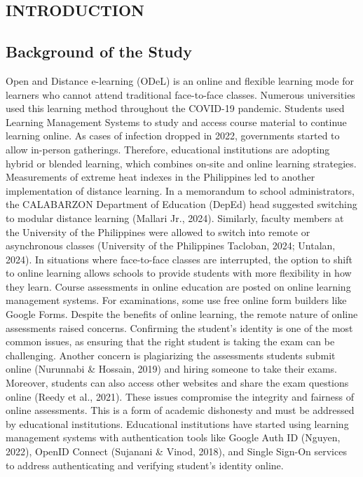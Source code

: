 \documentclass{icsthesis}
\begin{document}
\begin{mainmatter}
		\section{INTRODUCTION}
			\subsection{Background of the Study}
Open and Distance e-learning (ODeL) is an online and flexible learning mode for learners who cannot attend traditional face-to-face classes. Numerous universities used this learning method throughout the COVID-19 pandemic. Students used Learning Management Systems to study and access course material to continue learning online. As cases of infection dropped in 2022, governments started to allow in-person gatherings. Therefore, educational institutions are adopting hybrid or blended learning, which combines on-site and online learning strategies. Measurements of extreme heat indexes in the Philippines led to another implementation of distance learning. In a memorandum to school administrators, the CALABARZON Department of Education (DepEd) head suggested switching to modular distance learning (Mallari Jr., 2024). Similarly, faculty members at the University of the Philippines were allowed to switch into remote or asynchronous classes (University of the Philippines Tacloban, 2024; Untalan, 2024). In situations where face-to-face classes are interrupted, the option to shift to online learning allows schools to provide students with more flexibility in how they learn. Course assessments in online education are posted on online learning management systems. For examinations, some use free online form builders like Google Forms. Despite the benefits of online learning, the remote nature of online assessments raised concerns. Confirming the student's identity is one of the most common issues, as ensuring that the right student is taking the exam can be challenging. Another concern is plagiarizing the assessments students submit online (Nurunnabi \& Hossain, 2019) and hiring someone to take their exams. Moreover, students can also access other websites and share the exam questions online (Reedy et al., 2021). These issues compromise the integrity and fairness of online assessments. This is a form of academic dishonesty and must be addressed by educational institutions. Educational institutions have started using learning management systems with authentication tools like Google Auth ID (Nguyen, 2022), OpenID Connect (Sujanani \& Vinod, 2018), and Single Sign-On services to address authenticating and verifying student's identity online. \\

\end{mainmatter}
\end{document}
